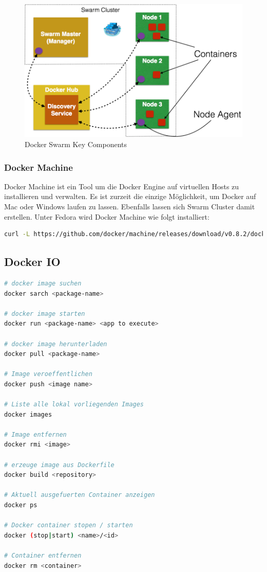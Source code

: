 \begin{figure}[h]
	\centering
	\includegraphics[width=0.5\linewidth]{appendix/docker/docker-swarm-cluster}
	\caption{Docker Swarm Key Components}
	\label{fig:docker-swarm-cluster}
\end{figure}

\subsubsection{Docker Machine}
Docker Machine ist ein Tool um die Docker Engine auf virtuellen Hosts zu installieren und verwalten. Es ist zurzeit die einzige Möglichkeit, um Docker auf Mac oder Windows laufen zu lassen. Ebenfalls lassen sich Swarm Cluster damit erstellen. Unter Fedora wird Docker Machine wie folgt installiert:
\begin{lstlisting}[language=bash]
curl -L https://github.com/docker/machine/releases/download/v0.8.2/docker-machine-`uname -s`-`uname -m` >/usr/local/bin/docker-machine && \ chmod +x /usr/local/bin/docker-machine
\end{lstlisting}

\subsection{Docker IO}
\begin{lstlisting}[language=bash]
# docker image suchen
docker sarch <package-name>

# docker image starten
docker run <package-name> <app to execute>

# docker image herunterladen
docker pull <package-name>

# Image veroeffentlichen
docker push <image name>

# Liste alle lokal vorliegenden Images
docker images

# Image entfernen
docker rmi <image>

# erzeuge image aus Dockerfile
docker build <repository>

# Aktuell ausgefuerten Container anzeigen
docker ps

# Docker container stopen / starten
docker (stop|start) <name>/<id>

# Container entfernen
docker rm <container>
\end{lstlisting}

